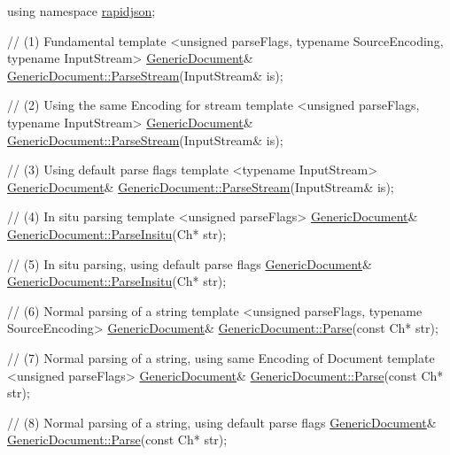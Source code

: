 \begin{DoxyCode}
\textcolor{keyword}{using namespace }\hyperlink{namespacerapidjson}{rapidjson};

\textcolor{comment}{// (1) Fundamental}
\textcolor{keyword}{template} <\textcolor{keywordtype}{unsigned} parseFlags, \textcolor{keyword}{typename} SourceEncoding, \textcolor{keyword}{typename} InputStream>
\hyperlink{class_generic_document}{GenericDocument}& \hyperlink{class_generic_document_afe94c0abc83a20f2d7dc1ba7677e6238}{GenericDocument::ParseStream}(InputStream& is);

\textcolor{comment}{// (2) Using the same Encoding for stream}
\textcolor{keyword}{template} <\textcolor{keywordtype}{unsigned} parseFlags, \textcolor{keyword}{typename} InputStream>
\hyperlink{class_generic_document}{GenericDocument}& \hyperlink{class_generic_document_afe94c0abc83a20f2d7dc1ba7677e6238}{GenericDocument::ParseStream}(InputStream& is);

\textcolor{comment}{// (3) Using default parse flags}
\textcolor{keyword}{template} <\textcolor{keyword}{typename} InputStream>
\hyperlink{class_generic_document}{GenericDocument}& \hyperlink{class_generic_document_afe94c0abc83a20f2d7dc1ba7677e6238}{GenericDocument::ParseStream}(InputStream& is);

\textcolor{comment}{// (4) In situ parsing}
\textcolor{keyword}{template} <\textcolor{keywordtype}{unsigned} parseFlags>
\hyperlink{class_generic_document}{GenericDocument}& \hyperlink{class_generic_document_a301f8f297a5a0da4b6be5459ad766f75}{GenericDocument::ParseInsitu}(Ch* str);

\textcolor{comment}{// (5) In situ parsing, using default parse flags}
\hyperlink{class_generic_document}{GenericDocument}& \hyperlink{class_generic_document_a301f8f297a5a0da4b6be5459ad766f75}{GenericDocument::ParseInsitu}(Ch* str);

\textcolor{comment}{// (6) Normal parsing of a string}
\textcolor{keyword}{template} <\textcolor{keywordtype}{unsigned} parseFlags, \textcolor{keyword}{typename} SourceEncoding>
\hyperlink{class_generic_document}{GenericDocument}& \hyperlink{class_generic_document_aebd4e7fddd80c1e1174837aee6d2159b}{GenericDocument::Parse}(\textcolor{keyword}{const} Ch* str);

\textcolor{comment}{// (7) Normal parsing of a string, using same Encoding of Document}
\textcolor{keyword}{template} <\textcolor{keywordtype}{unsigned} parseFlags>
\hyperlink{class_generic_document}{GenericDocument}& \hyperlink{class_generic_document_aebd4e7fddd80c1e1174837aee6d2159b}{GenericDocument::Parse}(\textcolor{keyword}{const} Ch* str);

\textcolor{comment}{// (8) Normal parsing of a string, using default parse flags}
\hyperlink{class_generic_document}{GenericDocument}& \hyperlink{class_generic_document_aebd4e7fddd80c1e1174837aee6d2159b}{GenericDocument::Parse}(\textcolor{keyword}{const} Ch* str);
\end{DoxyCode}


